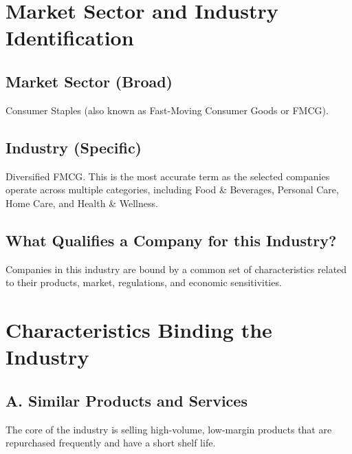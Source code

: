 \documentclass[12pt, a4paper]{report}
\begin{document}
\section{Market Sector and Industry Identification}

\subsection{Market Sector (Broad)}
Consumer Staples (also known as Fast-Moving Consumer Goods or FMCG).

\subsection{Industry (Specific)}
Diversified FMCG. This is the most accurate term as the selected companies operate across multiple categories, including Food \& Beverages, Personal Care, Home Care, and Health \& Wellness.

\subsection{What Qualifies a Company for this Industry?}

Companies in this industry are bound by a common set of characteristics related to their products, market, regulations, and economic sensitivities.

\section{Characteristics Binding the Industry}

\subsection{A. Similar Products and Services}

The core of the industry is selling high-volume, low-margin products that are repurchased frequently and have a short shelf life.
\end{document}
